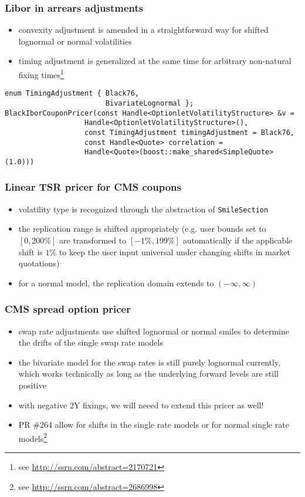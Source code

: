 \documentclass{beamer}
\begin{document}
\begin{frame}[fragile]
\frametitle{Libor in arrears adjustments}
\begin{itemize}
\item convexity adjustment is amended in a straightforward way for  shifted lognormal or normal volatilities
\item timing adjustment is generalized at the same time for arbitrary non-natural fixing times\footnote{see \url{http://ssrn.com/abstract=2170721}}
\end{itemize}
\begin{verbatim}
enum TimingAdjustment { Black76,
                        BivariateLognormal };
BlackIborCouponPricer(const Handle<OptionletVolatilityStructure> &v =
                   Handle<OptionletVolatilityStructure>(),
                   const TimingAdjustment timingAdjustment = Black76,
                   const Handle<Quote> correlation =
                   Handle<Quote>(boost::make_shared<SimpleQuote>(1.0)))
\end{verbatim}
\end{frame}

\begin{frame}[fragile]
\frametitle{Linear TSR pricer for CMS coupons}
\begin{itemize}
\item volatility type is recognized through the abstraction of \verb+SmileSection+
\item the replication range is shifted appropriately (e.g. user bounds set to $[0,200\%]$ are transformed to $[-1\%,199\%]$ automatically if the applicable shift is $1\%$ to keep the user input universal under changing shifts in market quotations)
\item for a normal model, the replication domain extends to $(-\infty,\infty)$
\end{itemize}
\end{frame}

\begin{frame}[fragile]
\frametitle{CMS spread option pricer}
\begin{itemize}
\item swap rate adjustments use shifted lognormal or normal smiles to determine the drifts of the single swap rate models
\item the bivariate model for the swap rates is still purely lognormal currently, which works technically as long as the underlying forward levels are still positive
\item with negative 2Y fixings, we will neeed to extend this pricer as well!
\item PR \#264 allow for shifts in the single rate models or for normal single rate models\footnote{see \url{http://ssrn.com/abstract=2686998}}
\end{itemize}
\end{frame}
\end{document}
